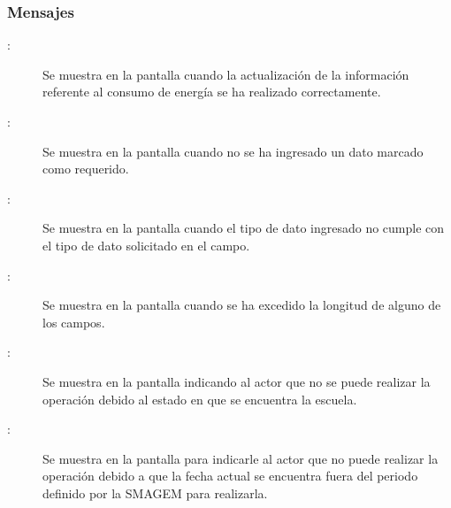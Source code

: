 \subsubsection{Mensajes}

    \begin{description}
	  \item [:] Se muestra en la pantalla  cuando la actualización de la información referente al consumo de energía se ha realizado correctamente.
	    
	  \item [:] Se muestra en la pantalla  cuando no se ha ingresado un dato marcado como requerido.
	    
	  \item  [:] Se muestra en la pantalla  cuando el tipo de dato ingresado no cumple con el tipo de dato solicitado en el campo.
	    
	  \item [:] Se muestra en la pantalla  cuando se ha excedido la longitud de alguno de los campos.	    
	  
	  \item [:] Se muestra en la pantalla  indicando al actor que no se puede realizar la operación debido al estado en que se encuentra la escuela.
	    
	    \item [:] Se muestra en la pantalla  para indicarle al actor que no puede realizar la operación debido a que la fecha actual se encuentra fuera del periodo definido por la SMAGEM para realizarla.
    \end{description}

